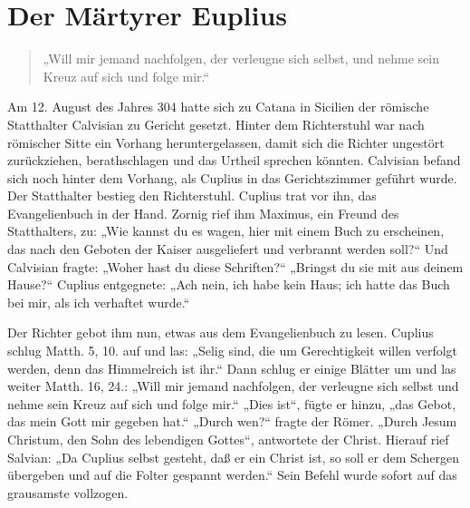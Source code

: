 \chapter{Der Märtyrer Euplius}

\begin{quote}
„Will mir jemand nachfolgen, der verleugne sich selbst, und nehme sein Kreuz auf sich und folge mir.“
\end{quote}

Am 12. August des Jahres 304 hatte sich zu Catana in Sicilien der römische Statthalter Calvisian zu Gericht gesetzt. Hinter dem Richterstuhl war nach römischer Sitte ein Vorhang heruntergelassen, damit sich die Richter ungestört zurückziehen, berathschlagen und das Urtheil sprechen könnten. Calvisian befand sich noch hinter dem Vorhang, als Cuplius in das Gerichtszimmer geführt wurde. Der Statthalter bestieg den Richterstuhl. Cuplius trat vor ihn, das Evangelienbuch in der Hand. Zornig rief ihm Maximus, ein Freund des Statthalters, zu: „Wie kannst du es wagen, hier mit einem Buch zu erscheinen, das nach den Geboten der Kaiser ausgeliefert und verbrannt werden soll?“ Und Calvisian fragte: „Woher hast du diese
Schriften?“ „Bringst du sie mit aus deinem Hause?“ Cuplius entgegnete: „Ach nein, ich habe kein Haus; ich hatte das Buch bei mir, als ich verhaftet wurde.“

Der Richter gebot ihm nun, etwas aus dem Evangelienbuch zu lesen. Cuplius schlug Matth. 5, 10. auf und las: „Selig sind, die um Gerechtigkeit willen verfolgt werden, denn das Himmelreich ist ihr.“ Dann schlug er einige Blätter um und las weiter Matth. 16, 24.: „Will mir jemand nachfolgen, der verleugne sich selbst und nehme sein Kreuz auf sich und folge mir.“ „Dies ist“, fügte er hinzu, „das Gebot, das mein Gott mir gegeben hat.“ „Durch wen?“ fragte der Römer. „Durch Jesum Christum, den Sohn des lebendigen Gottes“, antwortete der Christ. Hierauf rief Salvian: „Da Cuplius selbst gesteht, daß er ein Christ ist, so soll er dem Schergen übergeben und auf die Folter gespannt werden.“ Sein Befehl wurde sofort auf das grausamste vollzogen.

